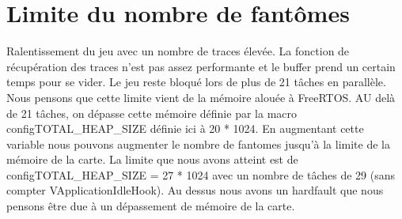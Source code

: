 \documentclass[a4paper]{article}
\begin{document}
\section{Limite du nombre de fantômes}
Ralentissement du jeu avec un nombre de traces élevée. La fonction de récupération
des traces n'est pas assez performante et le buffer prend un certain temps pour
se vider.
\newline
Le jeu reste bloqué lors de plus de 21 tâches en parallèle. Nous pensons que cette
limite vient de la mémoire alouée à FreeRTOS. AU delà de 21 tâches, on dépasse cette
mémoire définie par la macro configTOTAL\_HEAP\_SIZE définie ici à 20 * 1024. En augmentant
cette variable nous pouvons augmenter le nombre de fantomes jusqu'à la limite
de la mémoire de la carte. La limite que nous avons atteint est de configTOTAL\_HEAP\_SIZE = 27 * 1024
avec un nombre de tâches de 29 (sans compter VApplicationIdleHook). Au dessus nous
avons un hardfault que nous pensons être due à un dépassement de mémoire de la carte.
\end{document}
